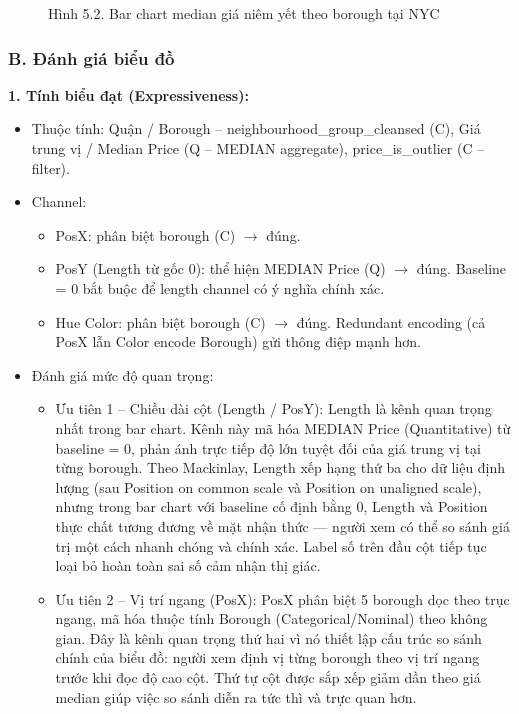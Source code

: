 \begin{figure}[H]
    \centering
    \caption{Hình 5.2. Bar chart median giá niêm yết theo borough tại NYC}
    \label{fig:domain-task5-chart2}
\end{figure}

\subsubsection*{B. Đánh giá biểu đồ}

\textbf{1. Tính biểu đạt (Expressiveness):}

\begin{itemize}
    \item Thuộc tính: Quận / Borough -- neighbourhood\_group\_cleansed (C), Giá trung vị / Median Price (Q -- MEDIAN aggregate), price\_is\_outlier (C -- filter).
    \item Channel:
    \begin{itemize}
        \item PosX: phân biệt borough (C) $\rightarrow$ đúng.
        \item PosY (Length từ gốc 0): thể hiện MEDIAN Price (Q) $\rightarrow$ đúng. Baseline = 0 bắt buộc để length channel có ý nghĩa chính xác.
        \item Hue Color: phân biệt borough (C) $\rightarrow$ đúng. Redundant encoding (cả PosX lẫn Color encode Borough) gửi thông điệp mạnh hơn.
    \end{itemize}
    \item Đánh giá mức độ quan trọng:
    \begin{itemize}
        \item Ưu tiên 1 -- Chiều dài cột (Length / PosY): Length là kênh quan trọng nhất trong bar chart. Kênh này mã hóa MEDIAN Price (Quantitative) từ baseline = 0, phản ánh trực tiếp độ lớn tuyệt đối của giá trung vị tại từng borough. Theo Mackinlay, Length xếp hạng thứ ba cho dữ liệu định lượng (sau Position on common scale và Position on unaligned scale), nhưng trong bar chart với baseline cố định bằng 0, Length và Position thực chất tương đương về mặt nhận thức --- người xem có thể so sánh giá trị một cách nhanh chóng và chính xác. Label số trên đầu cột tiếp tục loại bỏ hoàn toàn sai số cảm nhận thị giác.
        \item Ưu tiên 2 -- Vị trí ngang (PosX): PosX phân biệt 5 borough dọc theo trục ngang, mã hóa thuộc tính Borough (Categorical/Nominal) theo không gian. Đây là kênh quan trọng thứ hai vì nó thiết lập cấu trúc so sánh chính của biểu đồ: người xem định vị từng borough theo vị trí ngang trước khi đọc độ cao cột. Thứ tự cột được sắp xếp giảm dần theo giá median giúp việc so sánh diễn ra tức thì và trực quan hơn.

\end{itemize}
\end{itemize}
